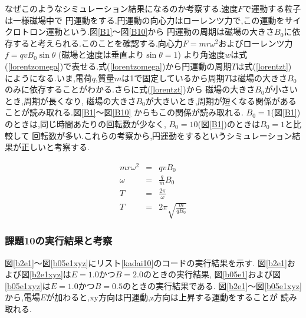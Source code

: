 \documentclass[a4j]{jarticle}
\begin{document}
          なぜこのようなシミュレーション結果になるのか考察する.速度\mbox{\boldmath $F$}で運動する粒子は一様磁場中で
          円運動をする.円運動の向心力はローレンツ力で,この運動をサイクロトロン運動という.図\ref{B1}～図\ref{B10}から
          円運動の周期は磁場の大きさ$B_0$に依存すると考えられる.このことを確認する.向心力$F=mr \omega^2$およびローレンツ力$f=qvB_0 \sin \theta$
          (磁場と速度は垂直より$\sin \theta =1$)
          より角速度$w$は式(\ref{lorentzomega})で表せる.式(\ref{lorentzomega})から円運動の周期$T$は式(\ref{lorentzt})
          にようになる.いま,電荷$q$,質量$m$は1で固定しているから周期$T$は磁場の大きさ$B_0$のみに依存することがわかる.さらに式(\ref{lorentzt})から
          磁場の大きさ$B_0$が小さいとき,周期が長くなり, 磁場の大きさ$B_0$が大きいとき,周期が短くなる関係があることが読み取れる.図\ref{B1}～図\ref{B10}
          からもこの関係が読み取れる. $B_0=1$(図\ref{B1})のときは,同じ時間あたりの回転数が少なく, $B_0=10$(図\ref{B1})のときは$B_0=1$と比較して
          回転数が多い.これらの考察から,円運動をするというシミュレーション結果が正しいと考察する.


          \begin{eqnarray}
            mr \omega^2 &=& qvB_0 \\
            \omega &=& \frac{q}{m}B_0 \label{lorentzomega} \\
            T &=& \frac{2 \pi}{\omega} \\
            T &=& 2 \pi \sqrt{\frac{m}{qB_0}} \label{lorentzt}
          \end{eqnarray}             


      \subsubsection{課題10の実行結果と考察}
        図\ref{b2e1}～図\ref{b05e1xyz}にリスト\ref{kadai10}のコードの実行結果を示す.
        図\ref{b2e1}および図\ref{b2e1xyz}は$E=1.0$かつ$B=2.0$のときの実行結果,
        図\ref{b05e1}および図\ref{b05e1xyz}は$E=1.0$かつ$B=0.5$のときの実行結果である.
        図\ref{b2e1}～図\ref{b05e1xyz}から,電場$E$が加わると,xy方向は円運動,z方向は上昇する運動をすることが
        読み取れる.
\end{document}
